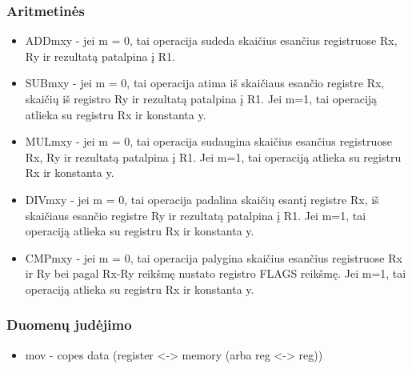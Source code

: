 \documentclass{VUMIFInfKursinis}
\begin{document}
\subsubsection{Aritmetinės}
\begin{itemize}
	
	\item ADDmxy - jei m = 0, tai operacija sudeda skaičius esančius registruose Rx, Ry ir rezultatą patalpina į R1.
	\item SUBmxy - jei m = 0, tai operacija atima iš skaičiaus esančio registre Rx, skaičių iš registro Ry ir rezultatą patalpina į R1. Jei m=1, tai operaciją atlieka su registru Rx ir konstanta y.
	\item MULmxy - jei m = 0, tai operacija sudaugina skaičius esančius registruose Rx, Ry ir rezultatą patalpina į R1. Jei m=1, tai operaciją atlieka su registru Rx ir konstanta y.
	\item DIVmxy - jei m = 0, tai operacija padalina skaičių esantį registre Rx, iš skaičiaus esančio registre Ry ir rezultatą patalpina į R1. Jei m=1, tai operaciją atlieka su registru Rx ir konstanta y.
	\item CMPmxy - jei m = 0, tai operacija palygina skaičius esančius registruose Rx ir Ry bei pagal Rx-Ry reikšmę nustato registro FLAGS reikšmę. Jei m=1, tai operaciją atlieka su registru Rx ir konstanta y.
\end{itemize}

\subsubsection{Duomenų judėjimo}
\begin{itemize}
	\item mov - copes data (register <-> memory (arba reg <-> reg))
\end{itemize}
\end{document}
